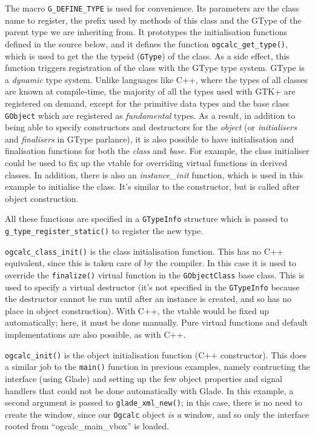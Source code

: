 \documentclass[a4paper,oneside]{article}
\newcommand{\variable}[1]{\textsl{#1}}
\newcommand{\class}[1]{\texttt{#1}}
\newcommand{\function}[1]{\texttt{#1()}}
\newcommand{\type}[1]{\texttt{#1}}
\newcommand{\code}[1]{\texttt{#1}}
\begin{document}
The macro \code{G\_DEFINE\_TYPE} is used for convenience.  Its
parameters are the class name to register, the prefix used by methods
of this class and the GType of the parent type we are inheriting from.
It prototypes the initialisation functions defined in the source
below, and it defines the function \function{ogcalc\_get\_type}, which
is used to get the the typeid (\type{GType}) of the class.  As a side
effect, this function triggers registration of the class with the
GType type system.  GType is a \emph{dynamic} type system.  Unlike
languages like C++, where the types of all classes are known at
compile-time, the majority of all the types used with GTK+ are
registered on demand, except for the primitive data types and the base
class \class{GObject} which are registered as \emph{fundamental}
types.  As a result, in addition to being able to specify constructors
and destructors for the \emph{object} (or \emph{initialisers} and
\emph{finalisers} in GType parlance), it is also possible to have
initialisation and finalisation functions for both the \emph{class}
and \emph{base}.  For example, the class initialiser could be used to
fix up the vtable for overriding virtual functions in derived classes.
In addition, there is also an \variable{instance\_init} function, which
is used in this example to initialise the class.  It's similar to the
constructor, but is called after object construction.

All these functions are specified in a \class{GTypeInfo} structure
which is passed to \function{g\_type\_register\_static} to register the
new type.

\function{ogcalc\_class\_init} is the class initialisation function.
This has no C++ equivalent, since this is taken care of by the
compiler.  In this case it is used to override the \function{finalize}
virtual function in the \class{GObjectClass} base class.  This is used
to specify a virtual destructor (it's not specified in the
\class{GTypeInfo} because the destructor cannot be run until after an
instance is created, and so has no place in object construction).
With C++, the vtable would be fixed up automatically; here, it must be
done manually.  Pure virtual functions and default implementations are
also possible, as with C++.

\function{ogcalc\_init} is the object initialisation function
(C++ constructor).  This does a similar job to the \function{main}
function in previous examples, namely contructing the interface (using
Glade) and setting up the few object properties and signal handlers
that could not be done automatically with Glade.  In this example, a
second argument is passed to \function{glade\_xml\_new}; in this case,
there is no need to create the window, since our \class{Ogcalc} object
\emph{is a} window, and so only the interface rooted from
``ogcalc\_main\_vbox'' is loaded.
\end{document}
